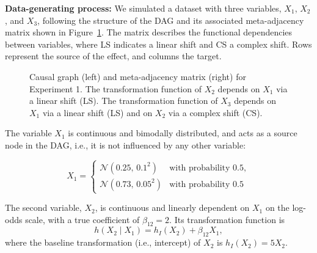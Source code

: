 \medskip

\textbf{Data-generating process: } We simulated a dataset with three variables, $X_1$, $X_2$, and $X_3$, following the structure of the DAG and its associated meta-adjacency matrix shown in Figure~\ref{fig:dag_and_matrix}. The matrix describes the functional dependencies between variables, where LS indicates a linear shift and CS a complex shift. Rows represent the source of the effect, and columns the target.


\begin{figure}[H]
\centering
{}
\caption{Causal graph (left) and meta-adjacency matrix (right) for Experiment 1. The transformation function of $X_2$ depends on $X_1$ via a linear shift (LS). The transformation function of $X_3$ depends on $X_1$ via a linear shift (LS) and on $X_2$ via a complex shift (CS).}
\label{fig:dag_and_matrix}
\end{figure}

The variable $X_1$ is continuous and bimodally distributed, and acts as a source node in the DAG, i.e., it is not influenced by any other variable:

\[
X_1 = 
\begin{cases}
\mathcal{N}(0.25,\, 0.1^2) & \text{with probability } 0.5, \\
\mathcal{N}(0.73,\, 0.05^2) & \text{with probability } 0.5
\end{cases}
\]


    
The second variable, $X_2$, is continuous and linearly dependent on $X_1$ on the log-odds scale, with a true coefficient of $\beta_{12} = 2$. Its transformation function is 
\[
h(X_2 \mid X_1) = h_I(X_2) + \beta_{12} X_1,
\]
where the baseline transformation (i.e., intercept) of $X_2$ is $h_I(X_2) = 5 X_2$.

